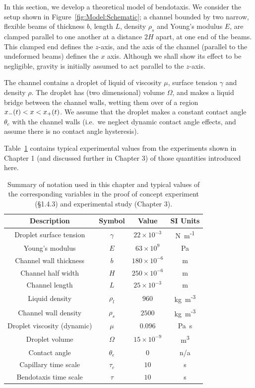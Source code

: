 In this section, we develop a theoretical model of bendotaxis. We consider the setup shown in Figure~\ref{fig:Model:Schematic}; a channel bounded by two narrow, flexible beams of thickness $b$, length $L$, density $\rho_s$ and Young's modulus $E$, are clamped parallel to one another at a distance $2H$ apart, at one end of the beams. This clamped end defines the $z$-axis, and the axis of the channel (parallel to the undeformed beams) defines the $x$ axis. Although we shall show its effect to be negligible, gravity is initially assumed to act parallel to the $z$-axis.

The channel contains a droplet of liquid of viscosity $\mu$, surface tension $\gamma$ and density $\rho$. The droplet has (two dimensional) volume $\Omega$, and makes a liquid bridge between the channel walls, wetting them over of a region $x_{-}(t) < x <x_{+}(t)$. We assume that the droplet makes a constant contact angle $\theta_e$ with the channel walls (i.e.~we neglect dynamic contact angle effects, and assume there is no contact angle hysteresis).

Table~\ref{T:Chapter2:ExptValues} contains typical experimental values from the experiments shown in Chapter 1 (and discussed further in Chapter 3) of those quantities introduced here.

\def\arraystretch{1.1}%
\begin{table}[t]
\begin{center}
\begin{tabular}{| c | c | c | c  |}
\hline
Description & Symbol & Value & SI Units \\ \hline \hline
Droplet surface tension & $\gamma$ & $22\times 10^{-3}$ & N~m\textsuperscript{-1}\\
Young's modulus & $E$ & $63\times 10^9$ & Pa\\
Channel wall thickness & $b$ & $180\times 10^{-6}$ & m\\
Channel half width & $H$ &$ 250\times 10^{-6}$ & m\\
Channel length & $L$  & $25\times 10^{-3}$ &m\\
Liquid density & $\rho_l$ & $960$ & kg~m\textsuperscript{-3}\\
Channel wall density & $\rho_s$ & $2500$ & kg~m\textsuperscript{-3}\\
Droplet viscosity (dynamic) & $\mu$ & $0.096$ & Pa~s  \\
Droplet volume & $\Omega$ & $15\times 10^{-9}$ & m\textsuperscript{3} \\
Contact angle & $\theta_e$ & $0$ & n/a\\
Capillary time scale & $\tau_c$ & $10$ & s \\
Bendotaxis time scale & $\tau$ & $10$ & s\\ \hline
\end{tabular}
\end{center}
\caption{Summary of notation used in this chapter and typical values of the corresponding variables in the proof of concept experiment (\S1.4.3) and experimental study (Chapter 3). }\label{T:Chapter2:ExptValues}
\end{table}
